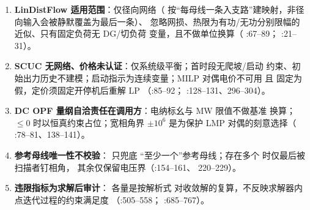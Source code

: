 \begin{enumerate}
  \item \textbf{LinDistFlow 适用范围}：仅径向网络（
        按“每母线一条入支路”建映射，非径向输入会被静默覆盖为最后一条）、
        忽略网损、热限为有功/无功分别限幅的近似、只有固定负荷无 DG/切负荷
        变量，且不做单位换算（
        :67--89；
        :21--31）。
  \item \textbf{SCUC 无网络、价格未认证}：仅系统级平衡；首时段无爬坡/启动
        约束、初始出力历史不建模；启动指示为连续变量；MILP 对偶电价不可用
        且  固定为假，定价须固定开停机后重解 LP
        （:85--92；
        :128--131、296--304）。
  \item \textbf{DC OPF 量纲自洽责任在调用方}：电纳标幺与 MW 限值不做基准
        换算；$\le 0$ 时以恒真约束占位；宽相角界
        $\pm 10^{6}$ 是为保护 LMP 对偶的刻意选择（
        :78--81、138--141）。
  \item \textbf{参考母线唯一性不校验}： 只兜底
        “至少一个”参考母线；存在多个  时仅最后被扫描者钉相角，
        其余仅保留电压界（:154--161、
        220--229）。
  \item \textbf{违限指标为求解后审计}： 各量是按解析式
        对收敛解的复算，不反映求解器内点迭代过程的约束满足度
        （:505--558；
        :685--767）。
\end{enumerate}
